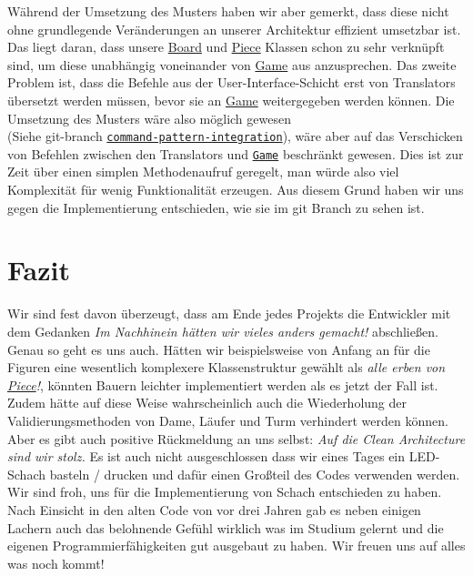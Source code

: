 \documentclass[
10pt, %
a4paper, %
oneside, %
headinclude,footinclude, %
BCOR5mm, %
]{scrartcl}
\begin{document}
\begin{onehalfspace}
Während der Umsetzung des Musters haben wir aber gemerkt, dass diese nicht ohne grundlegende Veränderungen an unserer Architektur effizient umsetzbar ist. Das liegt daran, dass unsere \href{https://github.com/schmida736/Chess-AdvancedSE/blob/main/Chess-AdvancedSE/Game\%20Elements/Board.cs}{Board} und \href{https://github.com/schmida736/Chess-AdvancedSE/blob/main/Chess-AdvancedSE/Game\%20Elements/Pieces/Piece.cs}{Piece} Klassen schon zu sehr verknüpft sind, um diese unabhängig voneinander von \href{https://github.com/schmida736/Chess-AdvancedSE/blob/main/Chess-AdvancedSE/Game\%20Elements/Game.cs}{Game} aus anzusprechen.
Das zweite Problem ist, dass die Befehle aus der User-Interface-Schicht erst von Translators übersetzt werden müssen, bevor sie an \href{https://github.com/schmida736/Chess-AdvancedSE/blob/main/Chess-AdvancedSE/Game\%20Elements/Game.cs}{Game} weitergegeben werden können. Die Umsetzung des Musters wäre also möglich gewesen \\(Siehe git-branch \texttt{\href{https://github.com/schmida736/Chess-AdvancedSE/tree/command-pattern-integration}{command-pattern-integration}}), wäre aber auf das Verschicken von Befehlen zwischen den Translators und \texttt{\href{https://github.com/schmida736/Chess-AdvancedSE/blob/main/Chess-AdvancedSE/Game\%20Elements/Game.cs}{Game}} beschränkt gewesen. Dies ist zur Zeit über einen simplen Methodenaufruf geregelt, man würde also viel Komplexität für wenig Funktionalität erzeugen. Aus diesem Grund haben wir uns gegen die Implementierung entschieden, wie sie im git Branch zu sehen ist.
\newpage
\section{Fazit}
\label{sec:end}

Wir sind fest davon überzeugt, dass am Ende jedes Projekts die Entwickler mit dem Gedanken \textit{Im Nachhinein hätten wir vieles anders gemacht!} abschließen. Genau so geht es uns auch. Hätten wir beispielsweise von Anfang an für die Figuren eine wesentlich komplexere Klassenstruktur gewählt als \textit{alle erben von \href{https://github.com/schmida736/Chess-AdvancedSE/blob/main/Chess-AdvancedSE/Game\%20Elements/Pieces/Piece.cs}{Piece}!}, könnten Bauern leichter implementiert werden als es jetzt der Fall ist. Zudem hätte auf diese Weise wahrscheinlich auch die Wiederholung der Validierungsmethoden von Dame, Läufer und Turm verhindert werden können. \\
Aber es gibt auch positive Rückmeldung an uns selbst: \textit{Auf die Clean Architecture sind wir stolz.} Es ist auch nicht ausgeschlossen dass wir eines Tages ein LED-Schach basteln / drucken und dafür einen Großteil des Codes verwenden werden.\\
Wir sind froh, uns für die Implementierung von Schach entschieden zu haben. Nach Einsicht in den alten Code von vor drei Jahren gab es neben einigen Lachern auch das belohnende Gefühl wirklich was im Studium gelernt und die eigenen Programmierfähigkeiten gut ausgebaut zu haben. Wir freuen uns auf alles was noch kommt!


\end{onehalfspace}
\end{document}
